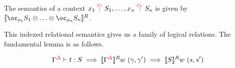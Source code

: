 The semantics of a context $\ctxvar{x_1}{S_1}{\rho_1}, \ldots, \ctxvar{x_n}{S_n}{\rho_n}$ is given by $\tensor{\llbracket \excl{\rho_1}{S_1}}{\tensor{\ldots}{\excl{\rho_n}{S_n}}} \rrbracket^R$.

This indexed relational semantics gives us a family of logical relations.
The fundamental lemma is as follows.

\begin{displaymath}
  \ctx{\Gamma}{\Delta} \vdash t : S \implies \llbracket \ctx{\Gamma}{\Delta} \rrbracket^R w~(\gamma, \gamma') \implies \llbracket S \rrbracket^R w~(s, s')
\end{displaymath}


